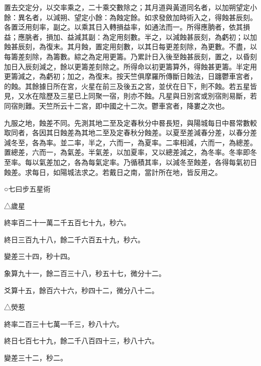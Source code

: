\begin{pinyinscope}
 置去交定分，以交率乘之，二十乘交數除之；其月道與黃道同名者，以加朔望定小餘：異名者，以減朔、望定小餘：為蝕定餘。如求發斂加時術入之，得蝕甚辰刻。各置泛用刻率，副之。以乘其日入轉損益率，如通法而一。所得應朒者，依其損益；應朓者，損加、益減其副：為定用刻數。半之，以減蝕甚辰刻，為虧初；以加蝕甚辰刻，為復末。其月蝕，置定用刻數，以其日每更差刻除，為更數。不盡，以每籌差刻除，為籌數。綜之為定用更籌。乃累計日入後至蝕甚辰刻，置之，以昏刻加日入辰刻減之，餘以更籌差刻除之。所得命以初更籌算外，得蝕甚更籌。半定用更籌減之，為虧初；加之，為復末。按天竺俱摩羅所傳斷日蝕法，日躔鬱車宮者，的蝕。其餘據日所在宮，火星在前三及後五之宮，並伏在日下，則不蝕。若五星皆見，又水在陰歷及三星已上同聚一宿，則亦不蝕。凡星與日別宮或別宿則易斷，若同宿則難。天竺所云十二宮，即中國之十二次。鬱車宮者，降婁之次也。



 九服之地，蝕差不同。先測其地二至及定春秋分中晷長短，與陽城每日中晷常數較取同者，各因其日蝕差為其地二至及定春秋分蝕差。以夏至差減春分差，以春分差減冬至，各為率。並二率，半之，六而一，為夏率。二率相減，六而一，為總差。置總差，六而一，為氣差。半氣差，以加夏率，又以總差減之，為冬率。冬率即冬至率。每以氣差加之，各為每氣定率。乃循積其率，以減冬至蝕差，各得每氣初日蝕差。求每日，如陽城法求之。若戴日之南，當計所在地，皆反用之。



 ○七曰步五星術



 △歲星



 終率百二十一萬二千五百七十九，秒六。



 終日三百九十八，餘二千六百五十九，秒六。



 變差三十四，秒十四。



 象算九十一，餘二百三十八，秒五十七，微分十二。



 爻算十五，餘百六十六，秒四十二，微分八十二。



 △熒惹



 終率二百三十七萬一千三，秒八十六。



 終日七百七十九，餘二千八百四十三，秒八十六。



 變差三十二，秒二。




\end{pinyinscope}
